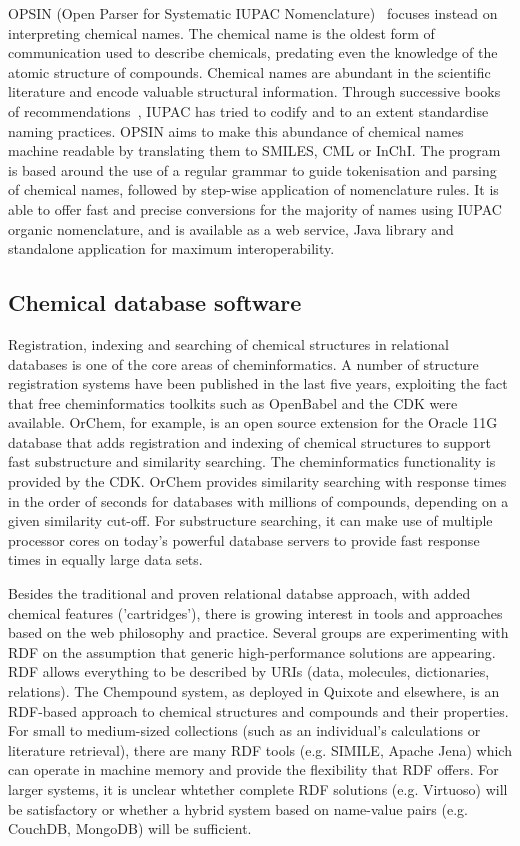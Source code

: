 \documentclass[10pt]{bmc_article}
\newenvironment{bmcformat}{\fussy\setboolean{publ}{true}}{\fussy}
\begin{document}
\begin{bmcformat}
OPSIN (Open Parser for Systematic IUPAC
Nomenclature)~\cite{lowe_chemical_2011} focuses instead on interpreting chemical names.
The chemical name is the oldest form of communication used to
describe chemicals, predating
even the knowledge of the atomic structure of compounds.
Chemical names are abundant in the scientific
literature and encode valuable structural information.
Through successive books of
recommendations~\cite{iupac_nomenclature_1979, iupac_guide_1993},
IUPAC has tried to codify and to an extent standardise naming practices.
OPSIN aims to make this abundance of
chemical names machine readable by translating them to SMILES, CML or
InChI. The program is based around the use of a regular grammar to
guide tokenisation and parsing of chemical names, followed by
step-wise application of nomenclature rules. It is able to offer
fast and precise conversions for the majority of names using IUPAC
organic nomenclature, and is available as a web service, Java
library and standalone application for maximum interoperability.

\subsection*{Chemical database software}

Registration, indexing and searching of chemical structures in
relational databases is one of the core areas of cheminformatics.
A number of structure registration systems have been published in the last five years, exploiting the fact that
free cheminformatics toolkits such as OpenBabel and the CDK were available.
OrChem,\cite{WebOrChem} for example, is an open source extension for the Oracle 11G database that
adds registration and indexing of chemical structures to support fast
substructure and similarity searching. The cheminformatics
functionality is provided by the CDK. OrChem
provides similarity searching with response times in the order of
seconds for databases with millions of compounds, depending on a given
similarity cut-off. For substructure searching, it can make use of
multiple processor cores on today's powerful database servers to
provide fast response times in equally large data sets.

Besides the traditional and proven relational databse approach, with
added chemical features ('cartridges'), there is growing
interest in tools and approaches based on the web philosophy and
practice. Several groups are experimenting with RDF
on the assumption that generic high-performance solutions are
appearing. RDF allows everything to be described by
URIs (data, molecules, dictionaries, relations). The Chempound system,
as deployed in
Quixote and elsewhere, is an RDF-based approach to chemical structures
and compounds and their properties. For small
to medium-sized collections (such as an individual's calculations or
literature retrieval), there are many RDF tools
(e.g. SIMILE, Apache Jena) which can operate in machine memory and provide
the flexibility that RDF offers. For larger
systems, it is unclear whtether complete RDF solutions (e.g. Virtuoso)
will be satisfactory or whether a hybrid system
based on name-value pairs (e.g. CouchDB, MongoDB) will be sufficient.


\end{bmcformat}
\end{document}
